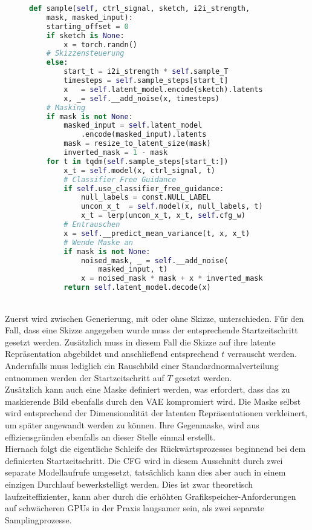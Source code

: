 \begin{figure}[htbp]
\begin{lstlisting}[language=python]
def sample(self, ctrl_signal, sketch, i2i_strength,
    mask, masked_input):
    starting_offset = 0
    if sketch is None:
        x = torch.randn()
    # Skizzensteuerung
    else:
        start_t = i2i_strength * self.sample_T
        timesteps = self.sample_steps[start_t]
        x   = self.latent_model.encode(sketch).latents
        x, _= self.__add_noise(x, timesteps)
    # Masking 
    if mask is not None:
        masked_input = self.latent_model
            .encode(masked_input).latents
        mask = resize_to_latent_size(mask)
        inverted_mask = 1 - mask
    for t in tqdm(self.sample_steps[start_t:])  
        x_t = self.model(x, ctrl_signal, t)
        # Classifier Free Guidance 
        if self.use_classifier_free_guidance:       
            null_labels = const.NULL_LABEL
            uncon_x_t  = self.model(x, null_labels, t)
            x_t = lerp(uncon_x_t, x_t, self.cfg_w)
        # Entrauschen
        x = self.__predict_mean_variance(t, x, x_t)        
        # Wende Maske an
        if mask is not None:
            noised_mask, _ = self.__add_noise(
                masked_input, t) 
            x = noised_mask * mask + x * inverted_mask
        return self.latent_model.decode(x)
\end{lstlisting}
    \captionsetup{type=figure}
    \label{fig:ldm_sample}
\end{figure} \\
Zuerst wird zwischen Generierung, mit oder ohne Skizze, unterschieden. Für den Fall, dass eine Skizze angegeben wurde muss der entsprechende Startzeitschritt gesetzt werden. Zusätzlich muss in diesem Fall die Skizze auf ihre latente Repräsentation abgebildet und anschließend entsprechend $t$ verrauscht werden. Andernfalls muss lediglich ein Rauschbild einer Standardnormalverteilung entnommen werden der Startzeitschritt auf $T$ gesetzt werden. \\ 
Zusätzlich kann auch eine Maske definiert werden, was erfordert, dass das zu maskierende Bild ebenfalls durch den \ac{VAE} kompromiert wird. Die Maske selbst wird entsprechend der Dimensionalität der latenten Repräsentationen verkleinert, um später angewandt werden zu können. Ihre Gegenmaske, wird aus effiziensgründen ebenfalls an dieser Stelle einmal erstellt. \\
Hiernach folgt die eigentliche Schleife des Rückwärtsprozesses beginnend bei dem definierten Startzeitschritt. Die \ac{CFG} wird in diesem Ausschnitt durch zwei separate Modellaufrufe umgesetzt, tatsächlich kann dies aber auch in einem einzigen Durchlauf bewerkstelligt werden. Dies ist zwar theoretisch laufzeiteffizienter, kann aber durch die erhöhten Grafikspeicher-Anforderungen auf schwächeren \ac{GPU}s in der Praxis langsamer sein, als zwei separate Samplingprozesse. \\

